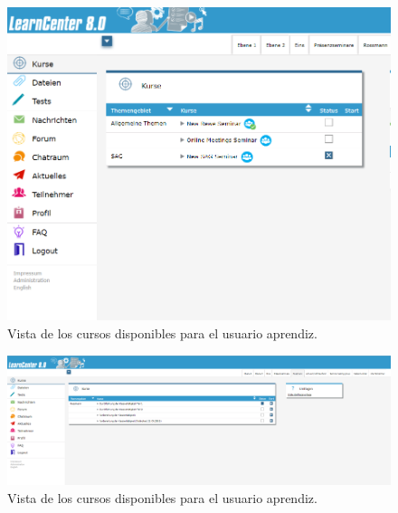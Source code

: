 \begin{figure}[h]
	\begin{center}
		\includegraphics[width=\textwidth]{screenshots/user_listar_cursos2.png}
		\caption{Vista de los cursos disponibles para el usuario aprendiz.} \label{fig:aprendizListarCursos}
	\end{center}
\end{figure}

\begin{figure}[h]
	\begin{center}
		\includegraphics[width=\textwidth]{screenshots/user_listar_seminar_viejo.png}
		\caption{Vista de los cursos disponibles para el usuario aprendiz.} \label{fig:aprendizListarViejo}
	\end{center}
\end{figure}

